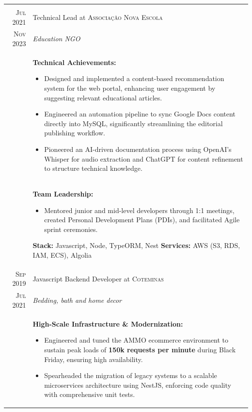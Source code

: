 \documentclass[a4paper,10pt]{article}
\begin{document}
\begin{supertabular}{r|p{15cm}}
{}\\[0.5em] 

\textsc{Jul 2021} & Technical Lead at \textsc{Associação Nova Escola} \\
\textsc{Nov 2023}&\emph{Education NGO}\\

& \footnotesize{
 \textbf{Technical Achievements:}
 \begin{itemize}
    \item Designed and implemented a content-based recommendation system for the web portal, enhancing user engagement by suggesting relevant educational articles.
    \item Engineered an automation pipeline to sync Google Docs content directly into MySQL, significantly streamlining the editorial publishing workflow.
    \item Pioneered an AI-driven documentation process using OpenAI's Whisper for audio extraction and ChatGPT for content refinement to structure technical knowledge.
 \end{itemize}
}\\

& \footnotesize{
 \textbf{Team Leadership:}
 \begin{itemize}
    \item Mentored junior and mid-level developers through 1:1 meetings, created Personal Development Plans (PDIs), and facilitated Agile sprint ceremonies.
 \end{itemize}
 \textbf{Stack:} Javascript, Node, TypeORM, Nest \textbf{ \textbar{} Services:} AWS (S3, RDS, IAM, ECS), Algolia}\\[0.5em]

\textsc{Sep 2019} & Javascript Backend Developer at \textsc{Coteminas} \\
\textsc{Jul 2021}&\emph{Bedding, bath and home decor}\\

& \footnotesize{
 \textbf{High-Scale Infrastructure \& Modernization:}
 \begin{itemize}
    \item Engineered and tuned the AMMO ecommerce environment to sustain peak loads of \textbf{150k requests per minute} during Black Friday, ensuring high availability.
    \item Spearheaded the migration of legacy systems to a scalable microservices architecture using NestJS, enforcing code quality with comprehensive unit tests.
 \end{itemize}
}\\


\end{supertabular}
\end{document}
